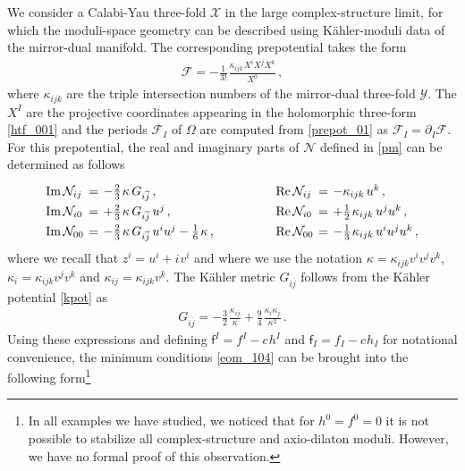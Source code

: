 \documentclass[12pt,a4paper]{article}
\newcommand{\eq}[1]{\begin{equation}
                     \begin{split} #1 \end{split}
                     \end{equation}}
\newcommand{\ov}{\overline}
\newcommand{\op}{\hspace{1pt}}
\numberwithin{equation}{section}
\begin{document}
We consider a Calabi-Yau three-fold $\mathcal X$ in the large complex-structure limit, 
for which the moduli-space
geometry can be described using K\"ahler-moduli data of the mirror-dual manifold. 
The corresponding prepotential takes the form
\eq{
\label{prepot_01}
  \mathcal F = -\frac{1}{3!}\op \frac{\kappa_{ijk}\op X^i X^j X^k}{X^0}  \,,
}
where $\kappa_{ijk}$ are the triple intersection numbers of the mirror-dual three-fold $\mathcal Y$.
The $X^I$ are the projective coordinates appearing in the holomorphic three-form \eqref{htf_001} 
and the periods $\mathcal F_I$ of $\Omega$ are computed from \eqref{prepot_01} 
as $\mathcal F_I = \partial_I \mathcal F$. 
For this prepotential, the real and imaginary parts of $\mathcal N$ defined in \eqref{pm} can 
be determined as follows 
\eq{
\label{periodlargecc}
  \arraycolsep2pt
  \renewcommand{\arraystretch}{1.35}
  \begin{array}{lcl@{\hspace{50pt}}lcl}
  {\rm Im}\, \mathcal{N}_{ij} &=& -\frac{2}{3} \op\kappa\, G_{i\ov j} \,,&
  {\rm Re}\, \mathcal{N}_{ij} &=& -\kappa_{ijk}\, u^k \,,  
  \\
  {\rm Im}\, \mathcal{N}_{i0} &=& +\frac{2}{3}\op\kappa\, G_{i\ov j}\, u^j \,, &
  {\rm Re}\, \mathcal{N}_{i0} &=& +\frac{1}{2}\op\kappa_{ijk}\, u^j u^k \,,
  \\
  {\rm Im}\, \mathcal{N}_{00} &=&  - \frac{2}{3}\op\kappa \, G_{i\ov j}\, u^i u^j  -\frac{1}{6}\op \kappa\,, &
  {\rm Re}\, \mathcal{N}_{00} &=& -\frac{1}{3}\op \kappa_{ijk}\, u^iu^j u^k \,,
  \end{array}
}  
where we recall that $z^i = u^i + i \op v^i$ and where we use the notation
$ \kappa = \kappa_{ijk} v^i v^j v^k$, $\kappa_i = \kappa_{ijk} v^j v^k $ and $ \kappa_{ij} = \kappa_{ijk}  v^k$.
The K\"ahler metric $G_{i\ov j}$ follows from the K\"ahler potential \eqref{kpot} as
\eq{
\label{geo_01}
G_{i\ov j} = -\frac{3}{2}\op \frac{\kappa_{ij}}{\kappa} + \frac{9}{4} \op\frac{\kappa_i \kappa_j}{\kappa^2} \,.
}
Using these expressions  and defining $\mathsf f^I = f^I - c \op h^I$ and 
$\mathsf f_I = f_I - c \op h_I$ for notational convenience, 
the minimum conditions \eqref{eom_104} can be brought into the following form\footnote{In all examples we
have studied, we noticed that
for $h^0=f^0=0$ it is not possible to stabilize all complex-structure and axio-dilaton moduli. However, we 
have no formal proof of this observation.\label{foot_modstab}}
\end{document}
